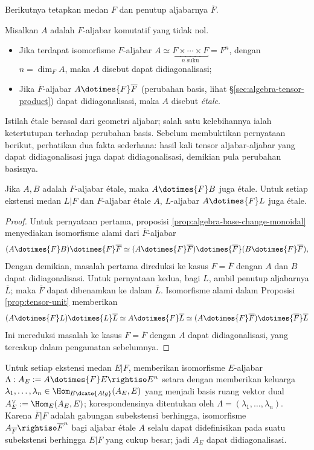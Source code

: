 Berikutnya tetapkan medan $F$ dan penutup aljabarnya $\overline{F}$.
\begin{definition}\label{def:etale-alg}
	Misalkan $A$ adalah $F$-aljabar komutatif yang tidak nol.
	\begin{itemize}
		\item Jika terdapat isomorfisme $F$-aljabar $A \simeq \underbracket{F \times \cdots \times F}_{n\;\text{suku}} = F^n$, dengan $n = \dim_F A$, maka $A$ disebut dapat didiagonalisasi;
		\item Jika $\overline{F}$-aljabar $A \dotimes{F} \overline{F}$ (perubahan basis, lihat \S\ref{sec:algebra-tensor-product}) dapat didiagonalisasi, maka $A$ disebut \emph{étale}.
	\end{itemize}
\end{definition}

Istilah étale berasal dari geometri aljabar; salah satu kelebihannya ialah ketertutupan terhadap perubahan basis. Sebelum membuktikan pernyataan berikut, perhatikan dua fakta sederhana: hasil kali tensor aljabar-aljabar yang dapat didiagonalisasi juga dapat didiagonalisasi, demikian pula perubahan basisnya.
\begin{lemma}\label{prop:etale-algebra-basechange}
	Jika $A, B$ adalah $F$-aljabar étale, maka $A \dotimes{F} B$ juga étale. Untuk setiap ekstensi medan $L|F$ dan $F$-aljabar étale $A$, $L$-aljabar $A \dotimes{F} L$ juga étale.
\end{lemma}
\begin{proof}
	Untuk pernyataan pertama, proposisi \ref{prop:algebra-base-change-monoidal} menyediakan isomorfisme alami dari $\overline{F}$-aljabar
	\[ (A \dotimes{F} B) \dotimes{F} \overline{F} \simeq (A \dotimes{F} \overline{F}) \dotimes{\overline{F}} (B \dotimes{F} \overline{F}), \]
	Dengan demikian, masalah pertama direduksi ke kasus $F=\overline{F}$ dengan $A$ dan $B$ dapat didiagonalisasi. Untuk pernyataan kedua, bagi $L$, ambil penutup aljabarnya $\overline{L}$; maka $\overline{F}$ dapat dibenamkan ke dalam $\overline{L}$. Isomorfisme alami dalam Proposisi \ref{prop:tensor-unit} memberikan
	\[ (A \dotimes{F} L) \dotimes{L} \overline{L} \simeq A \dotimes{F} \overline{L} \simeq (A \dotimes{F} \overline{F}) \dotimes{\overline{F}} \overline{L} \]
	Ini mereduksi masalah ke kasus $F=\overline{F}$ dengan $A$ dapat didiagonalisasi, yang tercakup dalam pengamatan sebelumnya.
\end{proof}

Untuk setiap ekstensi medan $E|F$, memberikan isomorfisme $E$-aljabar $\Lambda: A_E := A \dotimes{F} E \rightiso E^n$ setara dengan memberikan keluarga $\lambda_1, \ldots, \lambda_n \in \Hom_{E\dcate{Alg}}(A_E, E)$ yang menjadi basis ruang vektor dual $A_E^\vee := \Hom_E(A_E, E)$; korespondensinya ditentukan oleh $\Lambda = (\lambda_1, \ldots, \lambda_n)$. Karena $\overline{F}|F$ adalah gabungan subekstensi berhingga, isomorfisme $A_{\overline{F}} \rightiso \overline{F}^n$ bagi aljabar étale $A$ selalu dapat didefinisikan pada suatu subekstensi berhingga $E|F$ yang cukup besar; jadi $A_E$ dapat didiagonalisasi.

